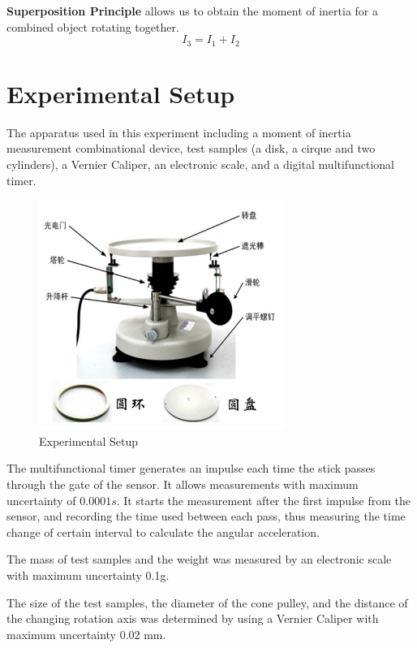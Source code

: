 \documentclass[12pt,a4paper]{article}
\begin{document}
\textbf{Superposition Principle} allows us to obtain the moment of inertia for a combined object rotating together.
\begin{equation} 
    I_3=I_1+I_2
\end{equation}


\section{Experimental Setup}
The apparatus used in this experiment including a moment of inertia measurement combinational device, test samples (a disk, a cirque and two cylinders), a Vernier Caliper, an electronic scale, and a digital multifunctional timer.\par

\begin{figure}[h]
    \centering
    \includegraphics[width=8cm]{apparatus.png}
    \caption{Experimental Setup}
\end{figure}
The multifunctional timer generates an impulse each time the stick passes through the gate of the sensor. It allows measurements with maximum uncertainty of $0.0001s$. It starts the measurement after the ﬁrst impulse from the sensor, and recording the time used between each pass, thus measuring the time change of certain interval to calculate the angular acceleration.\par
The mass of test samples and the weight was measured by an electronic scale with maximum uncertainty 0.1g.\par
The size of the test samples, the diameter of the cone pulley, and the distance of the changing rotation axis was determined by using a Vernier Caliper with maximum uncertainty 0.02 mm. 
\end{document}
